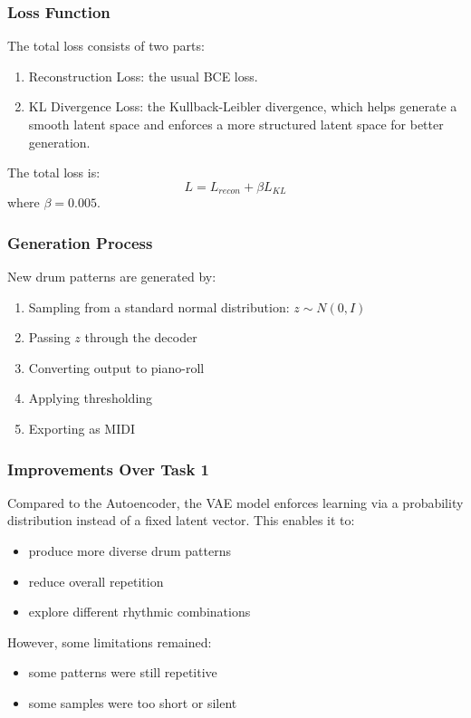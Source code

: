 \documentclass[conference]{IEEEtran}
\begin{document}
\subsubsection{Loss Function}
The total loss consists of two parts:
\begin{enumerate}
    \item {Reconstruction Loss}: the usual BCE loss.
    \item {KL Divergence Loss}: the Kullback-Leibler divergence, which helps generate a smooth latent space and enforces a more structured latent space for better generation.
\end{enumerate}
The total loss is:
\[
L = L_{recon} + \beta L_{KL}
\]
where $\beta = 0.005$.

\subsubsection{Generation Process}
New drum patterns are generated by:
\begin{enumerate}
    \item Sampling from a standard normal distribution: $z \sim N(0, I)$
    \item Passing $z$ through the decoder
    \item Converting output to piano-roll
    \item Applying thresholding
    \item Exporting as MIDI
\end{enumerate}

\subsubsection{Improvements Over Task 1}
Compared to the Autoencoder, the VAE model enforces learning via a probability distribution instead of a fixed latent vector. This enables it to:
\begin{itemize}
    \item produce more diverse drum patterns
    \item reduce overall repetition
    \item explore different rhythmic combinations
\end{itemize}
However, some limitations remained:
\begin{itemize}
    \item some patterns were still repetitive
    \item some samples were too short or silent
\end{itemize}
\end{document}
